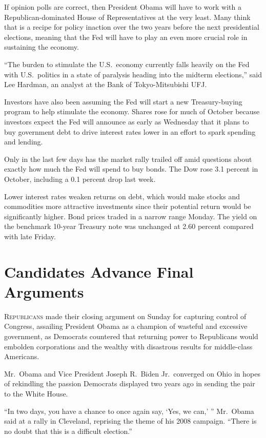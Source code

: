 ﻿\documentclass[12pt]{article}
\begin{document}
If opinion polls are correct, then President Obama will have to work with a Republican-dominated
House of Representatives at the very least. Many think that is a recipe for policy inaction over the
two years before the next presidential elections, meaning that the Fed will have to play an even
more crucial role in sustaining the economy.

``The burden to stimulate the U.S.~economy currently falls heavily on the Fed with U.S.~politics in
a state of paralysis heading into the midterm elections,'' said Lee Hardman, an analyst at the Bank
of Tokyo-Mitsubishi UFJ.

Investors have also been assuming the Fed will start a new Treasury-buying program to help stimulate
the economy. Shares rose for much of October because investors expect the Fed will announce as early
as Wednesday that it plans to buy government debt to drive interest rates lower in an effort to
spark spending and lending.

Only in the last few days has the market rally trailed off amid questions about exactly how much the
Fed will spend to buy bonds. The Dow rose 3.1 percent in October, including a 0.1 percent drop last
week.

Lower interest rates weaken returns on debt, which would make stocks and commodities more attractive
investments since their potential return would be significantly higher. Bond prices traded in a
narrow range Monday. The yield on the benchmark 10-year Treasury note was unchanged at 2.60 percent
compared with late Friday.


\section{Candidates Advance Final Arguments}

\lettrine{R}{epublicans} made their closing argument on Sunday for capturing
control of Congress, assailing President Obama as a champion of wasteful and excessive government,
as Democrats countered that returning power to Republicans would embolden corporations and the
wealthy with disastrous results for middle-class Americans.

Mr.~Obama and Vice President Joseph R.~Biden Jr.~converged on Ohio in hopes of rekindling the
passion Democrats displayed two years ago in sending the pair to the White House.

``In two days, you have a chance to once again say, `Yes, we can,' '' Mr.~Obama said at a rally in
Cleveland, reprising the theme of his 2008 campaign. ``There is no doubt that this is a difficult
election.''
\end{document}
